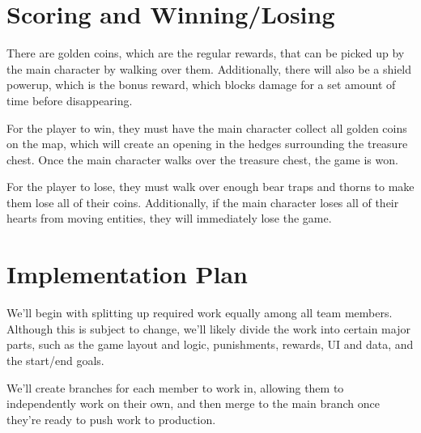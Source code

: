 \documentclass[10pt,letterpaper]{article}
\begin{document}
\section{Scoring and Winning/Losing}
    There are golden coins, which are the regular rewards, that can be picked up by the main character by walking over them. Additionally, there will also be a shield powerup, which is the bonus reward, which blocks damage for a set amount of time before disappearing.

    For the player to win, they must have the main character collect all golden coins on the map, which will create an opening in the hedges surrounding the treasure chest. Once the main character walks over the treasure chest, the game is won.

    For the player to lose, they must walk over enough bear traps and thorns to make them lose all of their coins. Additionally,  if the main character loses all of their hearts from moving entities, they will immediately lose the game.

\section{Implementation Plan}
    We'll begin with splitting up required work equally among all team members. Although this is subject to change, we'll likely divide the work into certain major parts, such as the game layout and logic, punishments, rewards, UI and data, and the start/end goals.

    We'll create branches for each member to work in, allowing them to independently work on their own, and then merge to the main branch once they're ready to push work to production.
\end{document}
